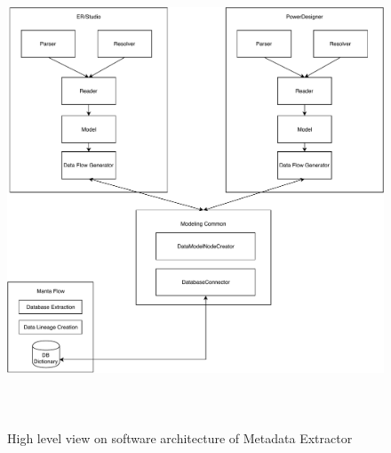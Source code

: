 \begin{figure}[H]
	\centering
	\includegraphics[height=14cm]{../img/SWArchitecture}
	\caption[Metadata Extractor Software Architecture]{High level view on software architecture of Metadata Extractor}
\end{figure}